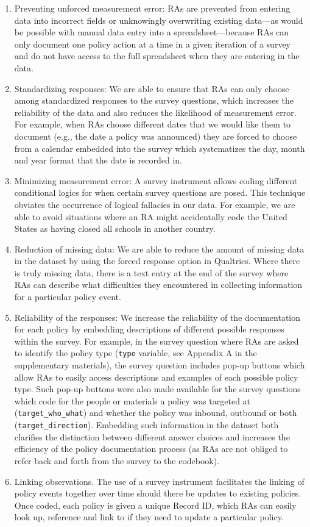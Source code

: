 \documentclass[]{article}
\begin{document}
\begin{enumerate}
\def\labelenumi{\arabic{enumi}.}
\item
  Preventing unforced measurement error: RAs are prevented from entering data into incorrect fields or unknowingly overwriting existing data---as would be possible with manual data entry into a spreadsheet---because RAs can only document one policy action at a time in a given iteration of a survey and do not have access to the full spreadsheet when they are entering in the data.
\item
  Standardizing responses: We are able to ensure that RAs can only choose among standardized responses to the survey questions, which increases the reliability of the data and also reduces the likelihood of measurement error. For example, when RAs choose different dates that we would like them to document (e.g., the date a policy was announced) they are forced to choose from a calendar embedded into the survey which systematizes the day, month and year format that the date is recorded in.
\item
  Minimizing measurement error: A survey instrument allows coding different conditional logics for when certain survey questions are posed. This technique obviates the occurrence of logical fallacies in our data. For example, we are able to avoid situations where an RA might accidentally code the United States as having closed all schools in another country.
\item
  Reduction of missing data: We are able to reduce the amount of missing data in the dataset by using the forced response option in Qualtrics. Where there is truly missing data, there is a text entry at the end of the survey where RAs can describe what difficulties they encountered in collecting information for a particular policy event.
\item
  Reliability of the responses: We increase the reliability of the documentation for each policy by embedding descriptions of different possible responses within the survey. For example, in the survey question where RAs are asked to identify the policy type (\texttt{type} variable, see Appendix A in the supplementary materials), the survey question includes pop-up buttons which allow RAs to easily access descriptions and examples of each possible policy type. Such pop-up buttons were also made available for the survey questions which code for the people or materials a policy was targeted at (\texttt{target\_who\_what}) and whether the policy was inbound, outbound or both (\texttt{target\_direction}). Embedding such information in the dataset both clarifies the distinction between different answer choices and increases the efficiency of the policy documentation process (as RAs are not obliged to refer back and forth from the survey to the codebook).
\item
  Linking observations. The use of a survey instrument facilitates the linking of policy events together over time should there be updates to existing policies. Once coded, each policy is given a unique Record ID, which RAs can easily look up, reference and link to if they need to update a particular policy.
\end{enumerate}
\end{document}
